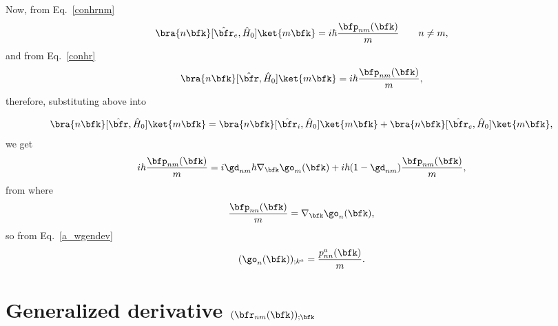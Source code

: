 Now, from Eq.~\eqref{conhrnm} 
\begin{equation}\label{a_hre}
\bra{n\bfk}[\hat\bfr_e,\hat{H}_0]\ket{m\bfk}=
i\hbar\frac{\bfp_{nm}(\bfk)}{m}
\quad\quad n\ne m 
,
\end{equation}
and from Eq.~\eqref{conhr} 
\begin{equation}\label{a_hr}
\bra{n\bfk}[\hat\bfr,\hat{H}_0]\ket{m\bfk}=
i\hbar\frac{\bfp_{nm}(\bfk)}{m}
,
\end{equation}
therefore, substituting above into

\begin{equation}\label{a_hrt}
\bra{n\bfk}[\hat\bfr,\hat{H}_0]\ket{m\bfk}=
\bra{n\bfk}[\hat\bfr_i,\hat{H}_0]\ket{m\bfk}+
\bra{n\bfk}[\hat\bfr_e,\hat{H}_0]\ket{m\bfk}
,
\end{equation}
we get
\begin{equation}\label{a_hrt2}
i\hbar\frac{\bfp_{nm}(\bfk)}{m}=
i\gd_{nm}\hbar\nabla_\bfk\go_m(\bfk)
+
i\hbar(1-\gd_{nm})\frac{\bfp_{nm}(\bfk)}{m}
,
\end{equation}
from where
\begin{equation}\label{a_gradw}
\frac{\bfp_{nn}(\bfk)}{m}=
\nabla_\bfk\go_n(\bfk)
,
\end{equation}
so from Eq.~\eqref{a_wgendev}
\begin{equation}\label{a_gradw2}
(\go_n(\bfk))_{;k^a}=
\frac{p^a_{nn}(\bfk)}{m}
.
\end{equation}

\section{Generalized derivative $(\bfr_{nm}(\bfk))_{;\bfk}$}\label{ap_genderr}

